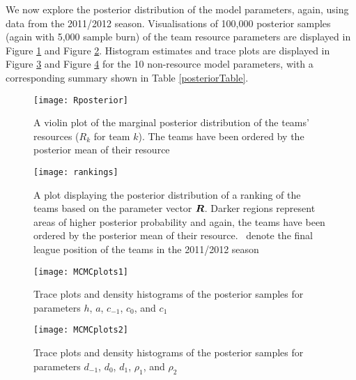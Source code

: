 We now explore the posterior distribution of the model parameters, again, using data from the 2011/2012 season.
Visualisations of 100,000 posterior samples (again with 5,000 sample burn) of the team resource parameters are displayed
in Figure \ref{Rposterior} and Figure \ref{Rankings}. Histogram estimates and trace plots are displayed in Figure
\ref{MCMCplots1} and Figure \ref{MCMCplots2} for the 10 non-resource model parameters, with a corresponding summary
shown in Table \ref{posteriorTable}.
\begin{figure}[htp]
\begin{center}
\texttt{[image: Rposterior]}
\caption{A violin plot of the marginal posterior distribution of the teams' resources (\(R_k\) for team \(k\)). The
teams have been ordered by the posterior mean of their resource}
\label{Rposterior}
\end{center}
\end{figure}
%
\begin{figure}[htp] 
\begin{center}
\texttt{[image: rankings]}
\caption{A plot displaying the posterior distribution of a ranking of the teams based on the parameter vector
\(\boldsymbol{R}\). Darker regions represent areas of higher posterior probability and again, the teams have been ordered by
the posterior mean of their resource. \protect\blackFilledCircle\ denote the final league position of the teams in
the 2011/2012 season}
\label{Rankings}
\end{center}
\end{figure}
%
\begin{figure}[htp]
\begin{center}
\texttt{[image: MCMCplots1]}
\caption{Trace plots and density histograms of the posterior samples for parameters \(h\), \(a\), \(c_{-1}\), \(c_0\),
and \(c_{1}\)}
\label{MCMCplots1}
\end{center}
\end{figure}
%
\begin{figure}[htp]
\begin{center}
\texttt{[image: MCMCplots2]}
\caption{Trace plots and density histograms of the posterior samples for parameters \(d_{-1}\), \(d_0\), \(d_{1}\),
\(\rho_1\), and \(\rho_2\)}
\label{MCMCplots2}
\end{center}
\end{figure}
%
